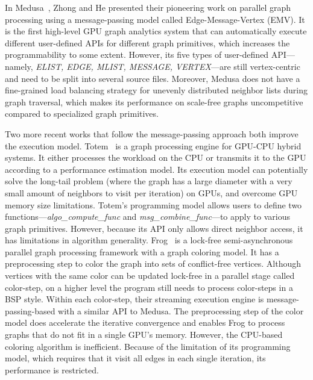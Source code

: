 \documentclass[format=acmsmall,review=false,screen=true]{acmart}
\begin{document}
In Medusa~\cite{Zhong:2014:MSG}, Zhong and He presented their
pioneering work on parallel graph processing using a message-passing
model called Edge-Message-Vertex (EMV). It is the first high-level GPU
graph analytics system that can automatically execute different
user-defined APIs for different graph primitives, which increases the
programmability to some extent. However, its five types of
user-defined API---namely, \emph{ELIST, EDGE, MLIST, MESSAGE,
  VERTEX}---are still vertex-centric and need to be split into several
source files. Moreover, Medusa does not have a fine-grained load
balancing strategy for unevenly distributed neighbor lists during
graph traversal, which makes its performance on scale-free graphs
uncompetitive compared to specialized graph primitives.

Two more recent works that follow the message-passing approach both
improve the execution model. Totem~\cite{Gharaibeh:2014:ELS} is a
graph processing engine for GPU-CPU hybrid systems. It either
processes the workload on the CPU or transmits it to the GPU according
to a performance estimation model. Its execution model can potentially
solve the long-tail problem (where the graph has a large diameter with
a very small amount of neighbors to visit per iteration) on GPUs, and
overcome GPU memory size limitations. Totem's programming model allows
users to define two functions---\textit{algo\_compute\_func} and
\textit{msg\_combine\_func}---to apply to various graph primitives.
However, because its API only allows direct neighbor access, it has
limitations in algorithm generality. Frog~\cite{Shi:2015:OAG} is a
lock-free semi-asynchronous parallel graph processing framework with a
graph coloring model. It has a preprocessing step to color the graph
into sets of conflict-free vertices. Although vertices with the same
color can be updated lock-free in a parallel stage called color-step,
on a higher level the program still needs to process color-steps in a
BSP style. Within each color-step, their streaming execution engine is
message-passing-based with a similar API to Medusa. The preprocessing
step of the color model does accelerate the iterative convergence and
enables Frog to process graphs that do not fit in a single GPU's
memory. However, the CPU-based coloring algorithm is inefficient.
Because of the limitation of its programming model, which requires
that it visit all edges in each single iteration, its performance is
restricted.
\end{document}

